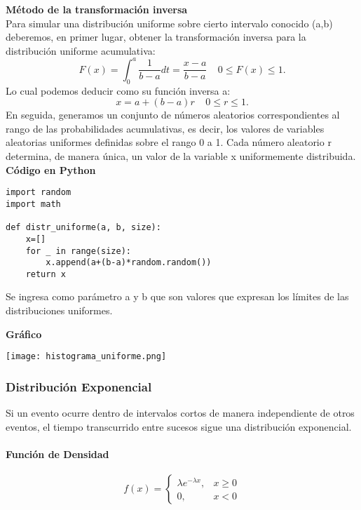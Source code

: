 \documentclass[11pt]{article}
\begin{document}
\noindent\textbf{Método de la transformación inversa}\\
  Para simular una distribución uniforme sobre cierto intervalo conocido (a,b) deberemos, en primer lugar, obtener la transformación inversa para la distribución uniforme acumulativa:
\begin{equation}
    F(x) = \int_{0}^{a}\frac{1}{b-a}dt = \frac{x-a}{b-a} \ \text{  } \ 0 \leq F(x) \leq 1.
  \end{equation}
Lo cual podemos deducir como su función inversa a:
  \begin{equation}
  x = a +(b-a)r \ \text{  }\ 0 \leq r \leq 1.
  \end{equation}
En seguida, generamos un conjunto de números aleatorios correspondientes al rango de las probabilidades acumulativas, es decir, los valores de variables aleatorias uniformes definidas sobre el rango 0 a 1. Cada número aleatorio r determina, de manera única, un valor de la variable x uniformemente distribuida.
\newpage
\noindent\textbf{Código en Python}

\begin{lstlisting}
import random
import math

def distr_uniforme(a, b, size):
    x=[]
    for _ in range(size):
        x.append(a+(b-a)*random.random())
    return x
\end{lstlisting}
Se ingresa como parámetro a y b que son valores que expresan los límites de las distribuciones uniformes.

\noindent\textbf{Gráfico}

\begin{center}
\texttt{[image: histograma\_uniforme.png]}
\end{center}


\newpage

\subsubsection{Distribución Exponencial}

Si un evento ocurre dentro de intervalos cortos de manera independiente de otros eventos, el tiempo transcurrido entre sucesos sigue una distribución exponencial.
\paragraph*{Función de Densidad\newline}
\[
f(x) = 
\begin{cases}
\lambda e^{-\lambda x}, & x \geq 0 \\
0, & x < 0
\end{cases}
\]
\end{document}

